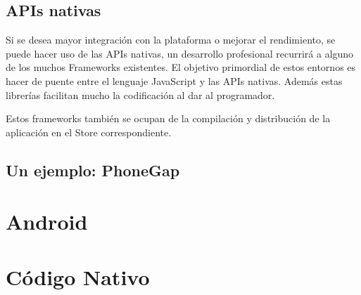 \documentclass[
10pt, %
a4paper, %
oneside, %
headinclude,footinclude, %
BCOR5mm, %
]{scrartcl}
\begin{document}
\subsection{APIs nativas}
Si se desea mayor integración con la plataforma o mejorar el rendimiento, se puede hacer uso de las APIs nativas, un desarrollo profesional recurrirá a alguno de los muchos Frameworks existentes. El objetivo primordial de estos entornos es hacer de puente entre el lenguaje JavaScript y las APIs nativas. Además estas librerías facilitan mucho la codificación al dar al programador.

Estos frameworks también se ocupan de la compilación y distribución de la aplicación en el Store correspondiente.

\subsection{Un ejemplo: PhoneGap}

\section{Android}

\section{Código Nativo}
\end{document}
